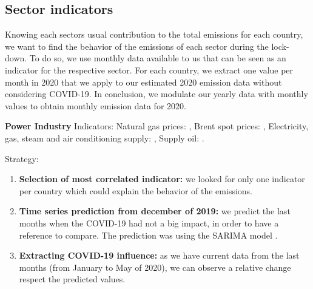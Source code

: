 \subsection{Sector indicators}

Knowing each sectors usual contribution to the total emissions for each country, we want to find the behavior of the \co emissions of each sector during the lock-down. To do so, we use monthly data available to us that can be seen as an indicator for the respective sector. For each country, we extract one value per month in 2020 that we apply to our estimated 2020 \co emission data without considering COVID-19. In conclusion, we modulate our yearly data with monthly values to obtain monthly \co emission data for 2020.

\textbf{Power Industry}
Indicators:
{Natural gas prices:} \cite{gas}, {Brent spot prices:} \cite{brent}, {Electricity, gas, steam and air conditioning supply:} \cite{production}, 
{Supply oil:} \cite{production}.

Strategy:
\begin{enumerate}
	\item \textbf{Selection of most correlated indicator:} we looked for only one indicator per country which could explain the behavior of the emissions. 
	\item \textbf{Time series prediction from december of 2019:} we predict the last months when the COVID-19 had not a big impact, in order to have a reference to compare. The prediction was using the SARIMA model \cite{sarima}. 
	\item \textbf{Extracting COVID-19 influence:} as we have current data from the last months (from January to May of 2020), we can observe a relative change respect the predicted values.
\end{enumerate}


